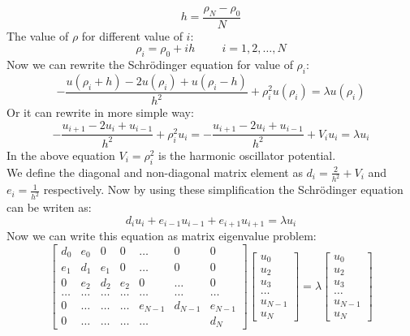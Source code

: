 \documentclass{article}
\begin{document}
$$ h = \dfrac{\rho_N - \rho_0}{N}$$
The value of $\rho$ for different value of $i$:
$$\rho_i= \rho_0 + ih \hspace{1cm} i=1,2,\dots , N$$
Now we can rewrite the Schrödinger equation for value of $\rho_i$:
$$
-\frac{u(\rho_i+h) -2u(\rho_i) +u(\rho_i-h)}{h^2}+\rho_i^2u(\rho_i)  = \lambda u(\rho_i)$$
Or it can rewrite in more simple way:
$$-\frac{u_{i+1} -2u_i +u_{i-1}}{h^2}+\rho_i^2u_i=-\frac{u_{i+1} -2u_i +u_{i-1} }{h^2}+V_iu_i  = \lambda u_i$$
In the above equation $V_i = \rho_i^2$ is the harmonic oscillator potential.\\
We define the diagonal and non-diagonal matrix element as $d_{i} = \frac{2}{h^{2}} + V_{i}$ and $e_{i}= \frac{1}{h^{2}}$ respectively. Now by using these simplification the Schrödinger equation can be writen as:
\begin{equation*}
  d_{i}u_{i}+e_{i-1}u_{i-1}+e_{i+1}u_{i+1} = \lambda u_{i}
\end{equation*}
Now we can write this equation as matrix eigenvalue problem:
\begin{equation}
    \begin{bmatrix} d_0& e_0 & 0   & 0    & \dots  &0     & 0 \\
                                e_1 & d_1 & e_1 & 0    & \dots  &0     &0 \\
                                0   & e_2 & d_2 & e_2  &0       &\dots & 0\\
                                \dots  & \dots & \dots & \dots  &\dots      &\dots & \dots\\
                                0   & \dots & \dots & \dots  &e_{N-1}  &d_{N-1} & e_{N-1}\\
                                0   & \dots & \dots & \dots  &\dots       & & d_N\end{bmatrix}
                                 \begin{bmatrix} u_0 \\ u_2 \\ u_3 \\ \dots \\ u_{N-1} \\ u_{N}\end{bmatrix} = \lambda \begin{bmatrix} u_0 \\ u_2 \\ u_3 \\ \dots \\ u_{N-1} \\ u_{N}\end{bmatrix}
\label{eq:matrixse}
\end{equation}
\end{document}
